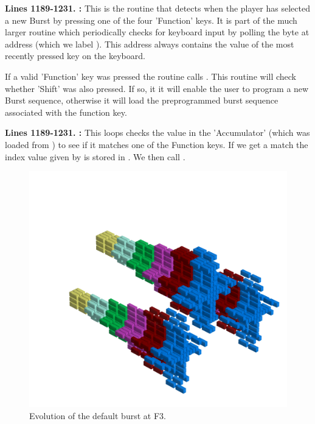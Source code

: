 \begin{figure}
%
\end{figure}
\textbf{Lines 1189-1231. :} This is the routine that detects when the player has selected a new
Burst by pressing one of the four 'Function' keys. It is part of the much larger routine  which periodically checks
for keyboard input by polling the byte at address  (which we label ). This address always
contains the value of the most recently pressed key on the keyboard.

If a valid 'Function' key was pressed the routine calls . This routine
will check whether 'Shift' was also pressed. If so, it it will enable the user to program a new
Burst sequence, otherwise it will load the preprogrammed burst sequence associated with the function key.

\textbf{Lines 1189-1231. :} This loops checks the value in the 'Accumulator' (which was loaded
from ) to see if it matches one of the Function keys. If we get a match the index value given by 
 is stored in . We then call .

\clearpage
\begin{figure}[H]
    \centering
    \begin{adjustbox}{width=12cm,center}
      \includegraphics[width=12cm]{src/patterns/bursts/pattern1-45.png}%
    \end{adjustbox}
\caption{Evolution of the default burst at F3.}
\end{figure}
\clearpage

